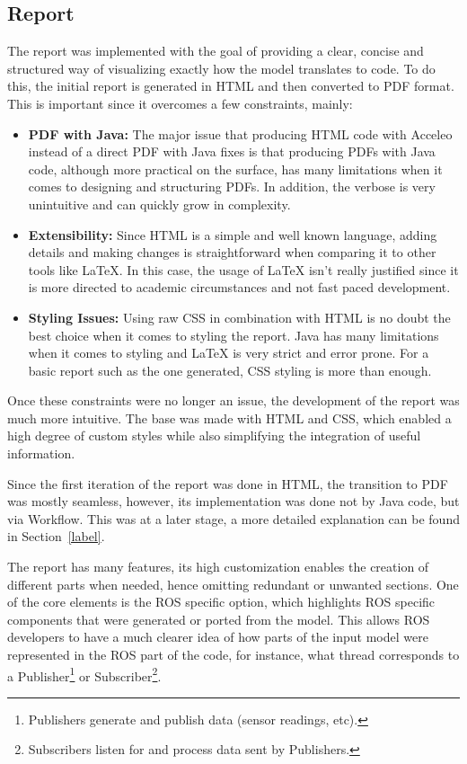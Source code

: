 \subsection{Report}
\label{sec:impl_report}

The report was implemented with the goal of providing a clear, concise and structured way of visualizing exactly how the model translates to code. To do this, the initial report is generated in HTML and then converted to PDF format. This is important since it overcomes a few constraints, mainly:

\begin{itemize} 
	\item \textbf{PDF with Java:} The major issue that producing HTML code with Acceleo instead of a direct PDF with Java fixes is that producing PDFs with Java code, although more practical on the surface, has many limitations when it comes to designing and structuring PDFs. In addition, the verbose is very unintuitive and can quickly grow in complexity.
	\item \textbf{Extensibility:} Since HTML is a simple and well known language, adding details and making changes is straightforward when comparing it to other tools like LaTeX. In this case, the usage of LaTeX isn't really justified since it is more directed to academic circumstances and not fast paced development.
	\item \textbf{Styling Issues:} Using raw \gls{CSS} in combination with \gls{HTML} is no doubt the best choice when it comes to styling the report. Java has many limitations when it comes to styling and LaTeX is very strict and error prone. For a basic report such as the one generated, \gls{CSS} styling is more than enough.
\end{itemize}

Once these constraints were no longer an issue, the development of the report was much more intuitive. The base was made with \gls{HTML} and \gls{CSS}, which enabled a high degree of custom styles while also simplifying the integration of useful information. 

Since the first iteration of the report was done in \gls{HTML}, the transition to PDF was mostly seamless, however, its implementation was done not by Java code, but via Workflow. This was at a later stage, a more detailed explanation can be found in Section~\ref{label}.

The report has many features, its high customization enables the creation of different parts when needed, hence omitting redundant or unwanted sections. One of the core elements is the \gls{ROS} specific option, which highlights \gls{ROS} specific components that were generated or ported from the model. This allows \gls{ROS} developers to have a much clearer idea of how parts of the input model were represented in the \gls{ROS} part of the code, for instance, what thread corresponds to a Publisher\footnote{Publishers generate and publish data (sensor readings, etc).} or Subscriber\footnote{Subscribers listen for and process data sent by Publishers.}.









